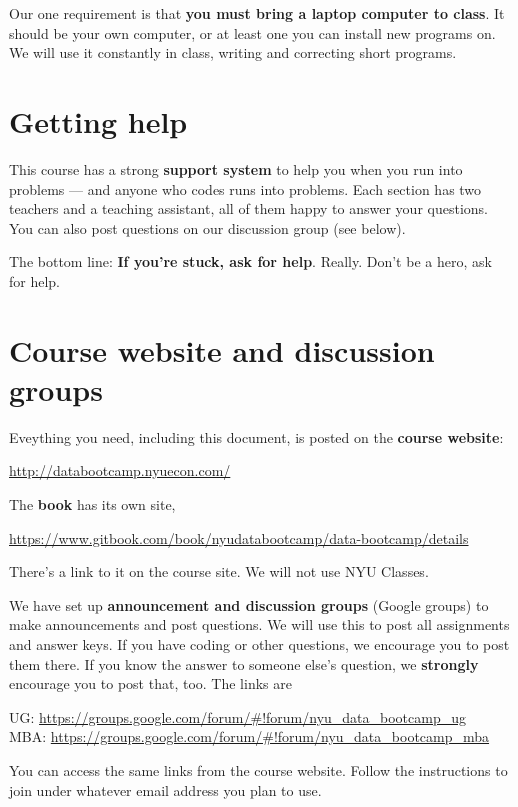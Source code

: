 \documentclass[11pt]{article}
\begin{document}
Our one requirement is that {\bf you must bring a laptop computer to class\/}.
It should be your own computer, or at least one you can install new programs on.
We will use it constantly in class, writing and correcting short programs.


\section*{Getting help}

This course has a strong {\bf support system\/} to help you when you run into problems ---
and anyone who codes runs into problems.
Each section has two teachers and a teaching assistant, all of them happy to answer your questions.
You can also post questions on our discussion group (see below).

The bottom line:  {\bf If you're stuck, ask for help\/}.
Really.  Don't be a hero, ask for help.



\section*{Course website and discussion groups}

Eveything you need, including this document, is posted on
the {\bf course website\/}:
%
\vspace{-0.15in}
\begin{center}
\url{http://databootcamp.nyuecon.com/}
\end{center}
\vspace{-0.15in}
%
The {\bf book\/} has its own site,
\vspace{-0.15in}
\begin{center}
\url{https://www.gitbook.com/book/nyudatabootcamp/data-bootcamp/details}
\end{center}
\vspace{-0.15in}
%
There's a link to it on the course site.
We will not use NYU Classes.

We have set up {\bf announcement and discussion groups\/} (Google groups)
to make announcements and post questions. We will use this to post all assignments and
answer keys.
If you have coding or other questions, we encourage you to post them there.
If you know the answer to someone else's question, we {\bf strongly } encourage you to post that, too.
The links are
\vspace{-0.1in}
\begin{center}
UG:   \url{https://groups.google.com/forum/#!forum/nyu_data_bootcamp_ug}  \\
MBA:  \url{https://groups.google.com/forum/#!forum/nyu_data_bootcamp_mba}
\end{center}
\vspace{-0.1in}
%
You can access the same links from the course website.  Follow the instructions to join under whatever email address you plan to use.
\end{document}
